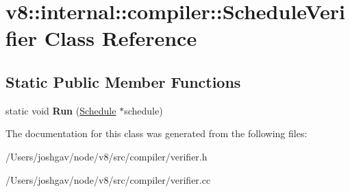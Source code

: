 \hypertarget{classv8_1_1internal_1_1compiler_1_1_schedule_verifier}{}\section{v8\+:\+:internal\+:\+:compiler\+:\+:Schedule\+Verifier Class Reference}
\label{classv8_1_1internal_1_1compiler_1_1_schedule_verifier}
\subsection*{Static Public Member Functions}
\begin{DoxyCompactItemize}
\item 
static void {\bfseries Run} (\hyperlink{classv8_1_1internal_1_1compiler_1_1_schedule}{Schedule} $\ast$schedule)\hypertarget{classv8_1_1internal_1_1compiler_1_1_schedule_verifier_ac9dd5c8cf231784a64601369e0b3d596}{}\label{classv8_1_1internal_1_1compiler_1_1_schedule_verifier_ac9dd5c8cf231784a64601369e0b3d596}

\end{DoxyCompactItemize}


The documentation for this class was generated from the following files\+:\begin{DoxyCompactItemize}
\item 
/\+Users/joshgav/node/v8/src/compiler/verifier.\+h\item 
/\+Users/joshgav/node/v8/src/compiler/verifier.\+cc\end{DoxyCompactItemize}
